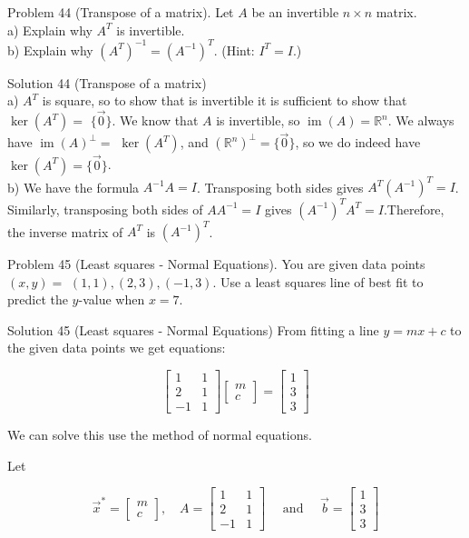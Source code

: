 \documentclass[10pt]{article}
\begin{document}
Problem 44 (Transpose of a matrix). Let $A$ be an invertible $n \times n$ matrix.\\
a) Explain why $A^{T}$ is invertible.\\
b) Explain why $\left(A^{T}\right)^{-1}=\left(A^{-1}\right)^{T}$. (Hint: $I^{T}=I$.)

Solution 44 (Transpose of a matrix)\\
a) $A^{T}$ is square, so to show that is invertible it is sufficient to show that $\operatorname{ker}\left(A^{T}\right)=$ $\{\overrightarrow{0}\}$. We know that $A$ is invertible, so $\operatorname{im}(A)=\mathbb{R}^{n}$. We always have $\operatorname{im}(A)^{\perp}=$ $\operatorname{ker}\left(A^{T}\right)$, and $\left(\mathbb{R}^{n}\right)^{\perp}=\{\overrightarrow{0}\}$, so we do indeed have $\operatorname{ker}\left(A^{T}\right)=\{\overrightarrow{0}\}$.\\
b) We have the formula $A^{-1} A=I$. Transposing both sides gives $A^{T}\left(A^{-1}\right)^{T}=I$. Similarly, transposing both sides of $A A^{-1}=I$ gives $\left(A^{-1}\right)^{T} A^{T}=I$.Therefore, the inverse matrix of $A^{T}$ is $\left(A^{-1}\right)^{T}$.

Problem 45 (Least squares - Normal Equations). You are given data points $(x, y)=$ $(1,1),(2,3),(-1,3)$. Use a least squares line of best fit to predict the $y$-value when $x=7$.

Solution 45 (Least squares - Normal Equations) From fitting a line $y=m x+c$ to the given data points we get equations:

$$
\left[\begin{array}{cc}
1 & 1 \\
2 & 1 \\
-1 & 1
\end{array}\right]\left[\begin{array}{l}
m \\
c
\end{array}\right]=\left[\begin{array}{l}
1 \\
3 \\
3
\end{array}\right]
$$

We can solve this use the method of normal equations.

Let

$$
\vec{x}^{*}=\left[\begin{array}{c}
m \\
c
\end{array}\right], \quad A=\left[\begin{array}{cc}
1 & 1 \\
2 & 1 \\
-1 & 1
\end{array}\right] \quad \text { and } \quad \vec{b}=\left[\begin{array}{l}
1 \\
3 \\
3
\end{array}\right]
$$
\end{document}
